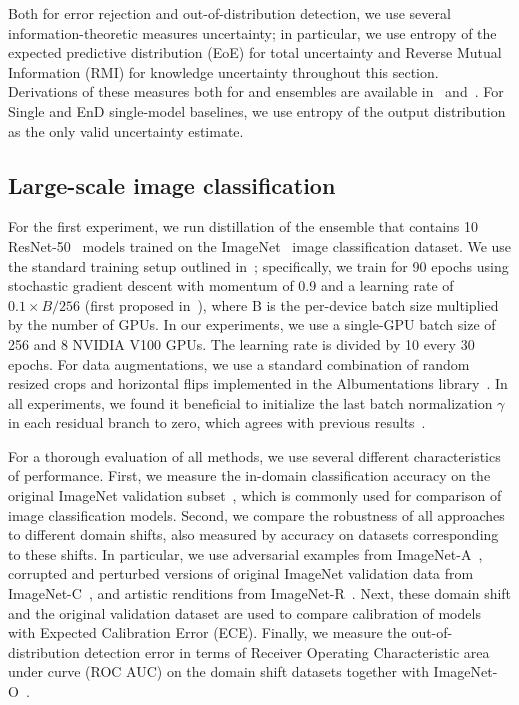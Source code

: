 Both for error rejection and out-of-distribution detection, we use several information-theoretic measures uncertainty; in particular, we use entropy of the expected predictive distribution (EoE) for total uncertainty and Reverse Mutual Information (RMI) for knowledge uncertainty throughout this section.
Derivations of these measures both for \Endd and ensembles are available in~\cite{malinin-thesis} and~\cite{malinin-structured-2020}.
For Single and EnD single-model baselines, we use
entropy of the output distribution as the only valid uncertainty estimate.

\subsection{Large-scale image classification}
\label{experiments:imagenet}

For the first experiment, we run distillation of the ensemble that contains 10 ResNet-50~\cite{resnet} models trained on the ImageNet~\cite{imagenet} image classification dataset. We use the standard training setup outlined in~\cite{touvron2019FixRes}; specifically, we train for 90 epochs using stochastic gradient descent with momentum of 0.9 and a learning rate of $0.1\times B/256$ (first proposed in~\cite{goyal2018accurate}), where B is the per-device batch size multiplied by the number of GPUs. 
In our experiments, we use a single-GPU batch size of 256 and 8 NVIDIA V100 GPUs. The learning rate is divided by 10 every 30 epochs. For data augmentations, we use a standard combination of random resized crops and horizontal flips implemented in the Albumentations library~\cite{albumentations}.
In all experiments, we found it beneficial to initialize the last batch normalization $\gamma$ in each residual branch to zero, which agrees with previous results~\cite{goyal2018accurate, zhang2018residual, rezero}.

For a thorough evaluation of all methods, we use several different characteristics of performance. First, we measure the in-domain classification accuracy on the original ImageNet validation subset~\cite{imagenet}, which is commonly used for comparison of image classification models. Second, we compare the robustness of all approaches to different domain shifts, also measured by accuracy on datasets corresponding to these shifts. In particular, we use adversarial examples from ImageNet-A~\cite{hendrycks2021nae}, corrupted and perturbed versions of original ImageNet validation data from ImageNet-C~\cite{hendrycks2019robustness}, and artistic renditions from ImageNet-R~\cite{hendrycks2020many}. Next, these domain shift and the original validation dataset are used to compare calibration of models with Expected Calibration Error (ECE).
Finally, we measure the out-of-distribution detection error in terms of Receiver Operating Characteristic area under curve (ROC AUC) on the domain shift datasets together with ImageNet-O~\cite{hendrycks2021nae}.

